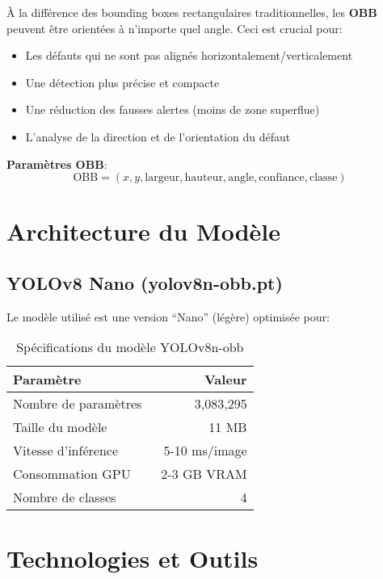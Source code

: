 \documentclass[a4paper,12pt]{report}
\begin{document}
À la différence des bounding boxes rectangulaires traditionnelles, les \textbf{OBB} peuvent être orientées à n'importe quel angle. Ceci est crucial pour:

\begin{itemize}
    \item Les défauts qui ne sont pas alignés horizontalement/verticalement
    \item Une détection plus précise et compacte
    \item Une réduction des fausses alertes (moins de zone superflue)
    \item L'analyse de la direction et de l'orientation du défaut
\end{itemize}

\textbf{Paramètres OBB}:
$$\text{OBB} = (x, y, \text{largeur}, \text{hauteur}, \text{angle}, \text{confiance}, \text{classe})$$

\section{Architecture du Modèle}

\subsection{YOLOv8 Nano (yolov8n-obb.pt)}

Le modèle utilisé est une version ``Nano'' (légère) optimisée pour:

\begin{table}[H]
    \centering
    \begin{tabular}{|l|r|}
    \hline
    \textbf{Paramètre} & \textbf{Valeur} \\
    \hline
    Nombre de paramètres & 3,083,295 \\
    \hline
    Taille du modèle & ~11 MB \\
    \hline
    Vitesse d'inférence & 5-10 ms/image \\
    \hline
    Consommation GPU & ~2-3 GB VRAM \\
    \hline
    Nombre de classes & 4 \\
    \hline
    \end{tabular}
    \caption{Spécifications du modèle YOLOv8n-obb}
\end{table}

\section{Technologies et Outils}
\end{document}
